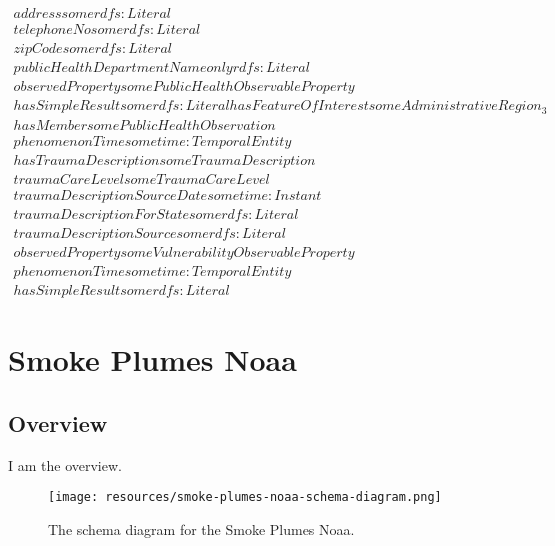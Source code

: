 \begin{align}
  address some rdfs:Literal \\
  telephoneNo some rdfs:Literal \\
  zipCode some rdfs:Literal \\
  publicHealthDepartmentName only rdfs:Literal \\
  observedProperty some PublicHealthObservableProperty \\
  hasSimpleResult some rdfs:Literal   hasFeatureOfInterest some AdministrativeRegion_3 \\
  hasMember some PublicHealthObservation \\
  phenomenonTime some time:TemporalEntity \\
  hasTraumaDescription some TraumaDescription \\
  traumaCareLevel some TraumaCareLevel \\
  traumaDescriptionSourceDate some time:Instant \\
  traumaDescriptionForState some rdfs:Literal \\
  traumaDescriptionSource some rdfs:Literal \\
  observedProperty some VulnerabilityObservableProperty \\
  phenomenonTime some time:TemporalEntity \\
  hasSimpleResult some rdfs:Literal \end{align}



\section{Smoke Plumes Noaa}
\label{sec:smoke-plumes-noaa}
\subsection{Overview}
\label{ssec:overview}

I am the overview.

\begin{figure}[h!]
  \begin{center}
    \texttt{[image: resources/smoke-plumes-noaa-schema-diagram.png]}
  \end{center}
  \caption{The schema diagram for the Smoke Plumes Noaa.}
  \label{fig:ov-diagram}
\end{figure}


